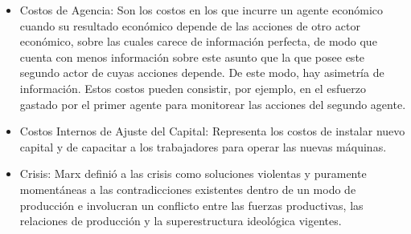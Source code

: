 \documentclass{article}
\begin{document}
\begin{itemize}
\item Costos de Agencia: Son los costos en los que incurre un agente económico cuando su resultado económico depende de las acciones de otro actor económico, sobre las cuales carece de información perfecta, de modo que cuenta con menos información sobre este asunto que la que posee este segundo actor de cuyas acciones depende. De este modo, hay asimetría de información. Estos costos pueden consistir, por ejemplo, en el esfuerzo gastado por el primer agente para monitorear las acciones del segundo agente. 

\item Costos Internos de Ajuste del Capital: Representa los costos de instalar nuevo capital y de capacitar a los trabajadores para operar las nuevas máquinas. 

\item Crisis: Marx definió a las crisis como soluciones violentas y puramente momentáneas a las contradicciones existentes dentro de un modo de producción e involucran un conflicto entre las fuerzas productivas, las relaciones de producción y la superestructura ideológica vigentes. 

\end{itemize}
\end{document}
